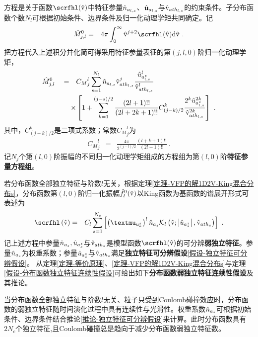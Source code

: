 方程是关于函数$\scrfhl (\rmvh)$中特征参量$\hat{n}_{a_{l,s}}$、$\hat{\mathbf{u}}_{a_{l,s}}$与$\hat{\mathrm{v}}_{{ath}_{l,s}}$的约束条件。子分布函数个数$N_l$可根据初始条件、边界条件及归一化动理学矩共同确定。记
\begin{eqnarray}
      {\Mh}_{j,l}^0 & = & 4 \pi \int_0^\infty \rmvh^{j+2} \scrfhl (\rmvh) \rmd \rmvh ~. \label{Mhfjl0}
\end{eqnarray}
把方程代入上述积分并化简可得采用特征参量表征的第$(j,l,0)$阶归一化动理学矩，
\begin{eqnarray}
\begin{aligned}
      {{\hat{M}}}_{j,l}^0 \quad = \quad & {C_M}_j^l \sum_{s=1}^{N_l} \hat{n}_{a_{l,s}} \hat{\mathrm{v}}_{{ath}_{l,s}}^j \frac{ {\hat{u}}_{a_{l,s}^z}^l}{\hat{\mathrm{v}}_{{ath}_{l,s}}^l} 
      \\
      \times & \left [1 + \sum_{k=1}^{(j-s)/2} \frac{(2 l + 1)!!}{(2 l + 2 k + 1)!!} C_{(j-k)/2}^k \frac{2^k {\hat{u}}_{a_{l,s}^z}^{2k}}{\hat{\mathrm{v}}_{{ath}_{l,s}}^{2k}} \right]~. \label{MhKjl0sl}
\end{aligned}
\end{eqnarray}
其中，$C_{(j-k)/2}^k$是二项式系数；常数${C_M}_j^l$为
\begin{eqnarray}
    {C_M}_j^l & = & \frac{ 4 \pi}{2^{(j-l)/2}}  \frac{(l + k + 1)!!}{(2 l - 1)!!} ~.
\end{eqnarray}
记$N_j$个第$(l,0)$阶振幅的不同归一化动理学矩组成的方程组为第$(l,0)$阶\textbf{特征参量方程组}。

若分布函数全部独立特征与阶数$l$无关，根据定理\ref{定理-VFP的解1D2V-King混合分布s}，分布函数第$(l,0)$阶归一化振幅$\hat{f}_l^0(\hat{\mathrm{v}})$以King函数为基函数的谱展开形式可表述为
\begin{eqnarray}
    \scrfhl \left(\rmvh \right) &=& C_l \sum_{s=1}^{N_c} \left [ \left (\muuas \right)^l \nhas \Kl \left(\rmvh;\left |\uhazs \right | , \vhaths \right) \right ]  ~.  \label{scrfl0s}
\end{eqnarray}
记上述方程中参量$\hat{n}_{a_s},{\hat{u}}_{a_s^z}$与$\hat{\mathrm{v}}_{{ath}_s}$是模型函数$\scrfhl(\rmvh)$的可分辨\textbf{弱独立特征}。参量$\hat{n}_{a_s}$为权重系数；参量${\hat{u}}_{a_s^z}$与$\hat{\mathrm{v}}_{{ath}_s}$满足\textbf{独立特征可分辨假设}\ref{假设-独立特征可分辨假设}。
从定理\ref{定理-等价原理}、\ref{定理-VFP的解1D2V-King混合分布s}与定理\ref{假设-分布函数独立特征连续性假设}可给出如下\textbf{分布函数弱独立特征连续性假设}及其推论。
\begin{theorem} \label{假设-分布函数弱独立特征连续性假设}
      当分布函数全部独立特征与阶数$l$无关、粒子只受到Coulomb碰撞效应时，分布函数的弱独立特征随时间演化过程中具有连续性与光滑性。权重系数$\hat{n}_{a_s}$可根据初始条件、边界条件结合推论\ref{推论-独立特征可分辨假设}来计算。此时分布函数具有$2N_c$个独立特征,且Coulomb碰撞总是趋向于减少分布函数弱独立特征数。
\end{theorem}

